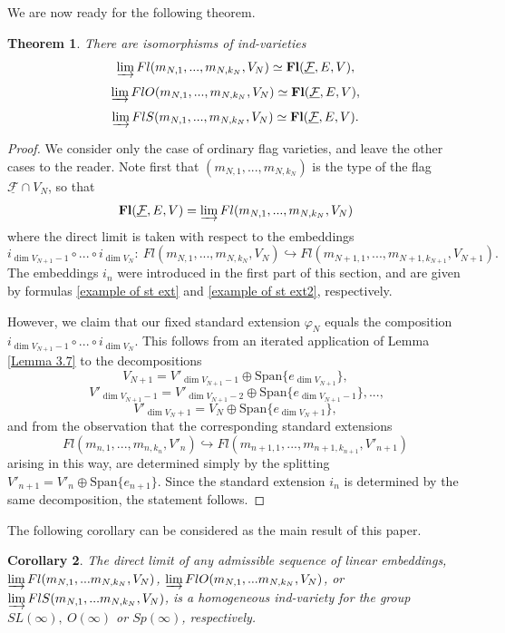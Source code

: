 \documentclass[12pt]{amsart}
\renewcommand{\phi}{\varphi}
\newtheorem{theorem}{Theorem}[section]
\newtheorem{corollary}[theorem]{Corollary}
\theoremstyle{definition}
\begin{document}
We are now ready for the following theorem.
\begin{theorem}\label{main thm}
There are isomorphisms of ind-varieties
$$
\varinjlim Fl(m_{N,1},...,m_{N,k_N},V_N)\simeq
\mathbf{Fl}(\mathcal{\underline{F}},E,V),
$$
$$
\varinjlim FlO(m_{N,1},...,m_{N,k_N},V_N)\simeq
\mathbf{Fl}(\mathcal{\underline{F}},E,V),
$$
$$
\varinjlim FlS(m_{N,1},...,m_{N,k_N},V_N)\simeq
\mathbf{Fl}(\mathcal{\underline{F}},E,V).
$$
\end{theorem}
\begin{proof}
We consider only the case of ordinary flag varieties, and 
leave the other cases to the reader. Note 
first that $(m_{N,1},...,m_{N,k_N})$ is the type of the flag
$\mathcal{\underline{F}}\cap V_N$, so that $$\mathbf{Fl}
(\mathcal{\underline{F}},E,V)=\varinjlim Fl(m_{N,1},...,
m_{N,k_N},V_N)$$ where the direct limit is taken with respect 
to the embeddings 
$$
i_{\dim V_{N+1}-1}\circ...\circ i_{\dim V_N}:\ Fl(m_{N,1},...,
m_{N,k_N},V_N)\hookrightarrow Fl(m_{N+1,1},...,
m_{N+1,k_{N+1}},V_{N+1}).
$$
The embeddings $i_n$ were introduced in the first part of this
section, and are given by formulas \eqref{example of st ext} 
and \eqref{example of st ext2}, respectively.

However, we claim that our fixed standard extension $\phi_N$ 
equals the composition $i_{\dim V_{N+1}-1}\circ...\circ 
i_{\dim V_N}$. This follows from an iterated application of
Lemma \ref{Lemma 3.7} to the decompositions
$$
V_{N+1}=V'_{\dim V_{N+1}-1}\oplus\mathrm{Span}\{e_{\dim V_{N+1}}
\},
$$
$$
\ V'_{\dim V_{N+1}-1}=V'_{\dim V_{N+1}-2}\oplus\mathrm{Span}
\{e_{\dim V_{N+1}-1}\},...,
$$
$$V'_{\dim V_N+1}=V_N\oplus\mathrm{Span}\{e_{\dim V_N+1}\},
$$ 
and from the observation that the corresponding standard
extensions
$$
Fl(m_{n,1},...,m_{n,k_n},V'_n)\hookrightarrow Fl(m_{n+1,1},...,
m_{n+1,k_{n+1}},V'_{n+1})
$$
arising in this way, are determined simply by the splitting
$V'_{n+1}=V'_n\oplus\mathrm{Span}\{e_{n+1}\}$. Since the 
standard extension $i_n$ is determined by the same 
decomposition, the statement follows. 
\end{proof}

The following corollary can be considered as the main result 
of this paper.

\begin{corollary}\label{cor 5.3}
The direct limit of any admissible sequence of linear 
embeddings, $\varinjlim Fl(m_{N,1},...m_{N,k_N},V_N)$, 
$\varinjlim FlO(m_{N,1},...m_{N,k_N},V_N)$, or $\varinjlim 
FlS(m_{N,1},...m_{N,k_N},V_N)$, is a homogeneous ind-variety
for the group $SL(\infty),\ O(\infty)$ or $Sp(\infty)$, 
respectively.
\end{corollary}
\end{document}
